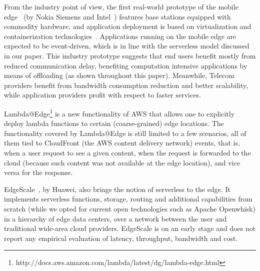 From the industry point of view, the first real-world prototype of the mobile edge~\cite{beck2014mobile} (by Nokia Siemens and Intel~\cite{NokiaMEC13}) features base stations equipped with commodity hardware, and application deployment is based on virtualization and containerization technologies~\cite{ismail2015icos}.  Applications running on the mobile edge are expected to be event-driven, which is in line with the serverless model discussed in our paper. 
This industry prototype suggests that end users
benefit mostly from reduced communication delay, benefiting computation intensive applications by means of offloading (as shown throughout this paper). Meanwhile, Telecom providers benefit from bandwidth consumption reduction and better scalability, while application providers profit with respect to faster
services.

Lambda@Edge\footnote{http://docs.aws.amazon.com/lambda/latest/dg/lambda-edge.html} is a new functionality of AWS that allows one to explicitly deploy lambda functions to certain (coarse-grained) edge locations. The functionality covered by Lambda@Edge is still limited to a few scenarios, all of them tied to CloudFront (the AWS content delivery network) events, that is, when a user request to see a given content, when the request is forwarded to the cloud (because such content was not available at the edge location), and vice versa for the response.

EdgeScale~\cite{Lara2016hierarchical}, by Huawei, also brings the notion of serverless to the edge. It implements serverless functions, storage, routing and additional capabilities from scratch (while we opted for current open technologies such as Apache Openwhisk) in a hierarchy of edge data centers, over a network between the user and traditional wide-area cloud providers. EdgeScale is on an early stage and does not report any empirical evaluation of latency, throughput, bandwidth and cost.

%









